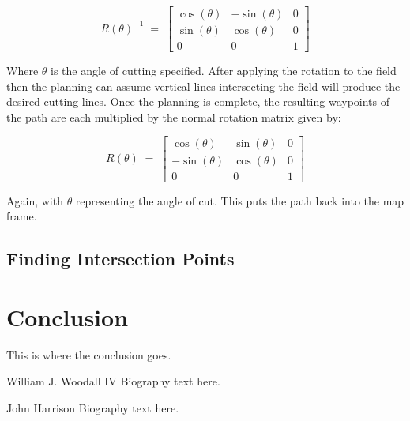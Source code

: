 \documentclass[journal]{IEEEtran}
\begin{document}
  $$R\left( \theta  \right)^{-1}\; =\; \left[ \begin{array}{ccc} \cos \left( \theta  \right) & -\sin \left( \theta  \right) & 0 \\ \sin \left( \theta  \right) & \cos \left( \theta  \right) & 0 \\ 0 & 0 & 1 \end{array} \right]$$
  
  Where $\theta$ is the angle of cutting specified.  After applying the rotation to the field then the planning can assume vertical lines intersecting the field will produce the desired cutting lines.  Once the planning is complete, the resulting waypoints of the path are each multiplied by the normal rotation matrix given by:
  
  $$R\left( \theta  \right)\; =\; \left[ \begin{array}{ccc} \cos \left( \theta  \right) & \sin \left( \theta  \right) & 0 \\ -\sin \left( \theta  \right) & \cos \left( \theta  \right) & 0 \\ 0 & 0 & 1 \end{array} \right]$$
  
  Again, with $\theta$ representing the angle of cut.  This puts the path back into the map frame.
  
  \subsection{Finding Intersection Points}
  
  
  \section{Conclusion}
  This is where the conclusion goes.
  
  \newpage
  
  
  
  
  \begin{IEEEbiography}{William J. Woodall IV}
  Biography text here.
  \end{IEEEbiography}
  
  \begin{IEEEbiography}{John Harrison}
  Biography text here.
  \end{IEEEbiography}
  
\end{document}
